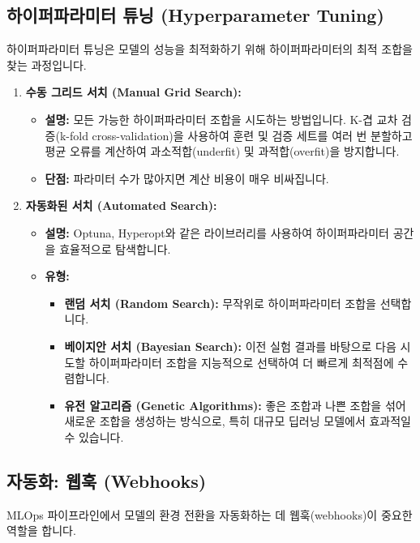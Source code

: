 \documentclass[11pt,a4paper]{article}
\begin{document}
\subsection{하이퍼파라미터 튜닝 (Hyperparameter Tuning)}

하이퍼파라미터 튜닝은 모델의 성능을 최적화하기 위해 하이퍼파라미터의 최적 조합을 찾는 과정입니다.

\begin{enumerate}
    \item \textbf{수동 그리드 서치 (Manual Grid Search):}
    \begin{itemize}
        \item \textbf{설명:} 모든 가능한 하이퍼파라미터 조합을 시도하는 방법입니다. K-겹 교차 검증(k-fold cross-validation)을 사용하여 훈련 및 검증 세트를 여러 번 분할하고 평균 오류를 계산하여 과소적합(underfit) 및 과적합(overfit)을 방지합니다.
        \item \textbf{단점:} 파라미터 수가 많아지면 계산 비용이 매우 비싸집니다.
    \end{itemize}

    \item \textbf{자동화된 서치 (Automated Search):}
    \begin{itemize}
        \item \textbf{설명:} Optuna, Hyperopt와 같은 라이브러리를 사용하여 하이퍼파라미터 공간을 효율적으로 탐색합니다.
        \item \textbf{유형:}
        \begin{itemize}
            \item \textbf{랜덤 서치 (Random Search):} 무작위로 하이퍼파라미터 조합을 선택합니다.
            \item \textbf{베이지안 서치 (Bayesian Search):} 이전 실험 결과를 바탕으로 다음 시도할 하이퍼파라미터 조합을 지능적으로 선택하여 더 빠르게 최적점에 수렴합니다.
            \item \textbf{유전 알고리즘 (Genetic Algorithms):} 좋은 조합과 나쁜 조합을 섞어 새로운 조합을 생성하는 방식으로, 특히 대규모 딥러닝 모델에서 효과적일 수 있습니다.
        \end{itemize}
    \end{itemize}
\end{enumerate}

\subsection{자동화: 웹훅 (Webhooks)}

MLOps 파이프라인에서 모델의 환경 전환을 자동화하는 데 웹훅(webhooks)이 중요한 역할을 합니다.
\end{document}

